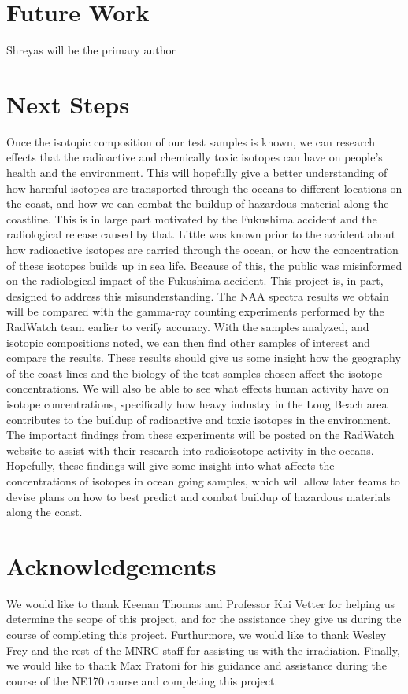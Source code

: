 \documentclass[]{article}
\begin{document}
\section{Future Work}
Shreyas will be the primary author


\section{Next Steps}
  
Once the isotopic composition of our test samples is known, we can research effects that the radioactive and chemically toxic isotopes can have on people’s health and the environment. This will hopefully give a better understanding of how harmful isotopes are transported through the oceans to different locations on the coast, and how we can combat the buildup of hazardous material along the coastline. This is in large part motivated by the Fukushima accident and the radiological release caused by that. Little was known prior to the accident about how radioactive isotopes are carried through the ocean, or how the concentration of these isotopes builds up in sea life. Because of this, the public was misinformed on the radiological impact of the Fukushima accident. This project is, in part, designed to address this misunderstanding. The NAA spectra results we obtain will be compared with the gamma-ray counting experiments performed by the RadWatch team earlier to verify accuracy. With the samples analyzed, and isotopic compositions noted, we can then find other samples of interest and compare the results. These results should give us some insight how the geography of the coast lines and the biology of the test samples chosen affect the isotope concentrations. We will also be able to see what effects human activity have on isotope concentrations, specifically how heavy industry in the Long Beach area contributes to the buildup of radioactive and toxic isotopes in the environment. The important findings from these experiments will be posted on the RadWatch website to assist with their research into radioisotope activity in the oceans. Hopefully, these findings will give some insight into what affects the concentrations of isotopes in ocean going samples, which will allow later teams to devise plans on how to best predict and combat buildup of hazardous materials along the coast. 

\section{Acknowledgements}

We would like to thank Keenan Thomas and Professor Kai Vetter for helping us determine the scope of this project, and for the assistance they give us during the course of completing this project. Furthurmore, we would like to thank Wesley Frey and the rest of the MNRC staff for assisting us with the irradiation. Finally, we would like to thank Max Fratoni for his guidance and assistance during the course of the NE170 course and completing this project.
\end{document}
